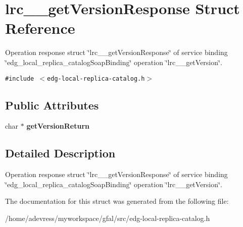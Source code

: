 \section{lrc\_\-\_\-get\-Version\-Response Struct Reference}
\label{structlrc____getVersionResponse}
Operation response struct \char`\"{}lrc\_\-\_\-get\-Version\-Response\char`\"{} of service binding \char`\"{}edg\_\-local\_\-replica\_\-catalog\-Soap\-Binding\char`\"{} operation \char`\"{}lrc\_\-\_\-get\-Version\char`\"{}.  


{\tt \#include $<$edg-local-replica-catalog.h$>$}

\subsection*{Public Attributes}
\begin{CompactItemize}
\item 
char $\ast$ \textbf{get\-Version\-Return}\label{structlrc____getVersionResponse_112065e209a2d1242342fc273190cdc1}

\end{CompactItemize}


\subsection{Detailed Description}
Operation response struct \char`\"{}lrc\_\-\_\-get\-Version\-Response\char`\"{} of service binding \char`\"{}edg\_\-local\_\-replica\_\-catalog\-Soap\-Binding\char`\"{} operation \char`\"{}lrc\_\-\_\-get\-Version\char`\"{}. 



The documentation for this struct was generated from the following file:\begin{CompactItemize}
\item 
/home/adevress/myworkspace/gfal/src/edg-local-replica-catalog.h\end{CompactItemize}
